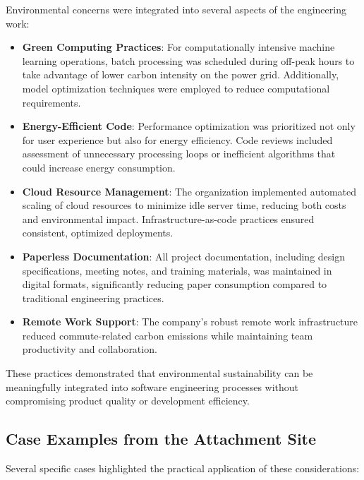 \documentclass[12pt,a4paper]{article}
\begin{document}
Environmental concerns were integrated into several aspects of the engineering work:

\begin{itemize}
    \item \textbf{Green Computing Practices}: For computationally intensive machine learning operations, batch processing was scheduled during off-peak hours to take advantage of lower carbon intensity on the power grid. Additionally, model optimization techniques were employed to reduce computational requirements.
    
    \item \textbf{Energy-Efficient Code}: Performance optimization was prioritized not only for user experience but also for energy efficiency. Code reviews included assessment of unnecessary processing loops or inefficient algorithms that could increase energy consumption.
    
    \item \textbf{Cloud Resource Management}: The organization implemented automated scaling of cloud resources to minimize idle server time, reducing both costs and environmental impact. Infrastructure-as-code practices ensured consistent, optimized deployments.
    
    \item \textbf{Paperless Documentation}: All project documentation, including design specifications, meeting notes, and training materials, was maintained in digital formats, significantly reducing paper consumption compared to traditional engineering practices.
    
    \item \textbf{Remote Work Support}: The company's robust remote work infrastructure reduced commute-related carbon emissions while maintaining team productivity and collaboration.
\end{itemize}

These practices demonstrated that environmental sustainability can be meaningfully integrated into software engineering processes without compromising product quality or development efficiency.

\subsection{Case Examples from the Attachment Site}

Several specific cases highlighted the practical application of these considerations:
\end{document}
